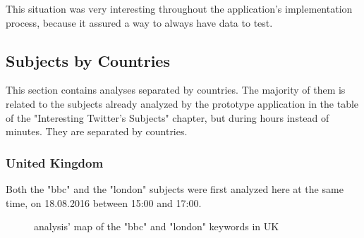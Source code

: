 \documentclass[a4paper,11pt]{report}
\begin{document}
This situation was very interesting throughout the application's implementation process, because it assured a way to always have data to test.

\subsection{Subjects by Countries}
This section contains analyses separated by countries. The majority of them is related to the subjects already analyzed by the prototype application in the table of the "Interesting Twitter's Subjects"
chapter, but during hours instead of minutes. They are separated by countries.

\subsubsection{United Kingdom}
Both the "bbc" and the "london" subjects were first analyzed here at the same time, on 18.08.2016 between 15:00 and 17:00.
\begin{figure}[H]
\vspace{-5pt}
\begin{center}
\vspace{-20pt}
\caption{analysis' map of the "bbc" and "london" keywords in UK}
\end{center}
\end{figure}
\vspace{-10pt}
\end{document}
